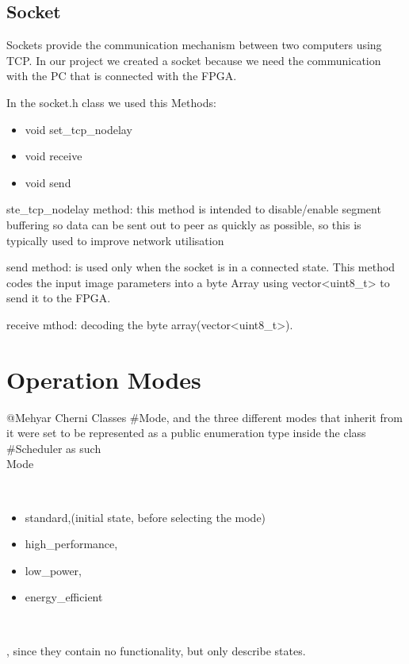 \documentclass[parskip=full]{scrartcl}
\newcommand\tab[1][1cm]{\hspace*{#1}}
\begin{document}
\pagebreak

\subsection{Socket}

Sockets provide the communication mechanism between two computers using TCP. In our project we created a socket because we need the communication with the PC that is connected with the FPGA. 

In the socket.h class we used this Methods:

\begin {itemize}
	\item void set_tcp_nodelay
	\item void receive
	\item void send
\end{itemize}

ste_tcp_nodelay method: this method is intended to disable/enable segment buffering so data can be sent out to peer as quickly as possible, so this is typically used to improve network utilisation

send method:  is used only when the socket is in a connected state. This method codes the input image parameters into a byte Array using vector<uint8_t> to send it to the FPGA.

receive mthod: decoding the byte array(vector<uint8_t>).

\pagebreak

\section{Operation Modes} \label{Operation Modes}
	@Mehyar Cherni
	\tab Classes #Mode, and the three different modes that inherit from it were set to be represented as a public enumeration type inside the class #Scheduler as such \\ Mode { \\
	\begin {itemize}
		\item standard,(initial state, before selecting the mode)
		\item high_performance, 
		\item low_power,
		\item energy_efficient
	\end{itemize}  \\
	} , since they contain no functionality, but only describe states.


\pagebreak
\end{document}
